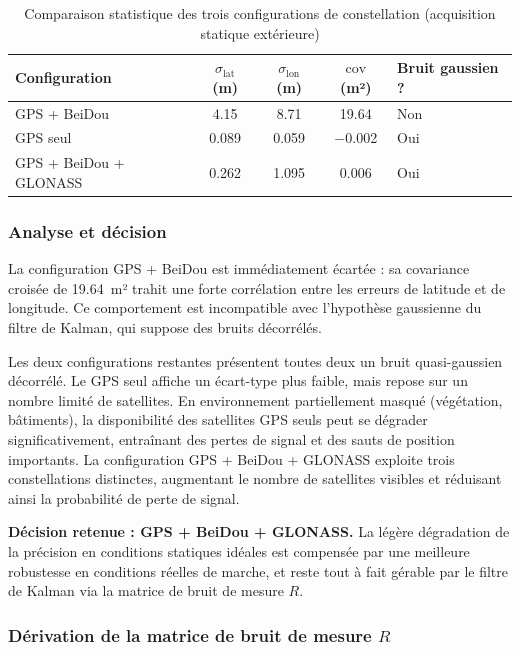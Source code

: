 \begin{table}[htbp]
    \centering
    \caption{Comparaison statistique des trois configurations de constellation
    (acquisition statique extérieure)}
    \begin{tabular}{lcccl}
        \hline
        \textbf{Configuration} & $\sigma_{\text{lat}}$ (m) &
        $\sigma_{\text{lon}}$ (m) & $\text{cov}$ (m²) &
        \textbf{Bruit gaussien ?} \\
        \hline
        GPS + BeiDou          & 4.15  & 8.71  & 19.64  & Non \\
        GPS seul              & 0.089 & 0.059 & $-$0.002 & Oui \\
        GPS + BeiDou + GLONASS & 0.262 & 1.095 & 0.006 & Oui \\
        \hline
    \end{tabular}
    \label{tab:constellations}
\end{table}

\subsubsection{Analyse et décision}

La configuration GPS + BeiDou est immédiatement écartée : sa covariance
croisée de 19.64~m² trahit une forte corrélation entre les erreurs de latitude
et de longitude. Ce comportement est incompatible avec l'hypothèse gaussienne
du filtre de Kalman, qui suppose des bruits décorrélés.

Les deux configurations restantes présentent toutes deux un bruit
quasi-gaussien décorrélé. Le GPS seul affiche un écart-type plus faible, mais
repose sur un nombre limité de satellites. En environnement partiellement
masqué (végétation, bâtiments), la disponibilité des satellites GPS seuls peut
se dégrader significativement, entraînant des pertes de signal et des sauts de
position importants. La configuration GPS + BeiDou + GLONASS exploite trois
constellations distinctes, augmentant le nombre de satellites visibles et
réduisant ainsi la probabilité de perte de signal.

\textbf{Décision retenue : GPS + BeiDou + GLONASS.} La légère dégradation
de la précision en conditions statiques idéales est compensée par une
meilleure robustesse en conditions réelles de marche, et reste tout à fait
gérable par le filtre de Kalman via la matrice de bruit de mesure $R$.

\subsubsection{Dérivation de la matrice de bruit de mesure $R$}

